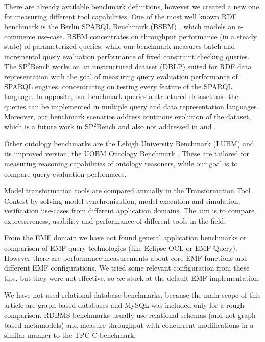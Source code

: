There are already available benchmark definitions, however we created a new one
for measuring different tool capabilities. One of the most well known RDF
benchmark is the Berlin SPARQL Benchmark (BSBM) \cite{BerlinBenchmark}, which
models an e-commerce use-case. BSBM concentrates on throughput performance (in a
steady state) of parameterized queries, while our benchmark measures batch and
incremental query evaluation performance of fixed constraint checking queries.
The SP$^2$Bench \cite{SP2Bench} works on an unstructured dataset (DBLP) suited
for RDF data representation with the goal of measuring query evaluation
performance of SPARQL engines, concentrating on testing every feature of the
SPARQL language. In opposite, our benchmark queries a structured dataset and 
the queries can be implemented in multiple query and data representation languages.
Moreover, our benchmark scenarios address continous evolution of the dataset,
which is a future work in SP$^2$Bench and also not addressed in \cite{SIB} and
\cite{DBpediaSparql}.

Other ontology benchmarks are the Lehigh University Benchmark (LUBM)
\cite{LUBMBenchmark} and its improved version, the UOBM Ontology Benchmark
\cite{UOBM}. These are tailored for measuring reasoning capabilities of ontology
reasoners, while our goal is to compare query evaluation performaces.

Model transformation tools are compared annually in the Transformation Tool
Contest \cite{TTC} by solving model synchronisation, model execution and
simulation, verification use-cases from different application domains. The aim
is to compare expressiveness, usability and performance of different
tools in the field. 

From the EMF domain we have not found general application benchmarks or
comparison of EMF query technologies (like Eclipse OCL or EMF Query). However
there are performance measurements \cite{EMF-performance} about core EMF
functions and different EMF configurations. We tried some relevant
configuration from these tips, but they were not effective, so we stuck at the
default EMF implementation.

We have not used relational database benchmarks, because the main scope of this
article are graph-based databases and MySQL was included only for a rough
comparison. RDBMS benchmarks usually use relational schemas (and not graph-based
metamodels) and measure throughput with concurrent modifications in a similar manner 
to the TPC-C \cite{tpc-c} benchmark.

